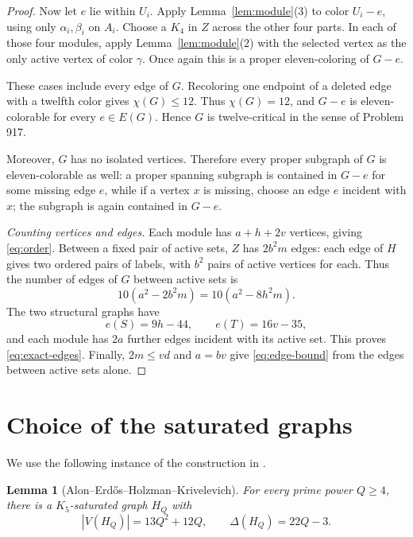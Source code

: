 \documentclass[11pt]{article}
\newtheorem{lemma}[theorem]{Lemma}
\numberwithin{equation}{section}
\begin{document}
\begin{proof}
Now let \(e\) lie within \(U_i\). Apply
Lemma~\ref{lem:module}(3) to color \(U_i-e\), using only
\(\alpha_i,\beta_i\) on \(A_i\). Choose a \(K_4\) in \(Z\)
across the other four parts. In each of those four modules,
apply Lemma~\ref{lem:module}(2) with the selected vertex as
the only active vertex of color \(\gamma\). Once again this
is a proper eleven-coloring of \(G-e\).

These cases include every edge of \(G\). Recoloring one endpoint
of a deleted edge with a twelfth color gives \(\chi(G)\le12\).
Thus \(\chi(G)=12\), and \(G-e\) is eleven-colorable for every
\(e\in E(G)\). Hence \(G\) is twelve-critical in the sense of
Problem 917.

Moreover, \(G\) has no isolated vertices. Therefore every proper
subgraph of \(G\) is eleven-colorable as well: a proper spanning
subgraph is contained in \(G-e\) for some missing edge \(e\), while
if a vertex \(x\) is missing, choose an edge \(e\) incident with
\(x\); the subgraph is again contained in \(G-e\).

\smallskip
\noindent\emph{Counting vertices and edges.}
Each module has \(a+h+2v\) vertices, giving \eqref{eq:order}.
Between a fixed pair of active sets, \(Z\) has \(2b^2m\) edges:
each edge of \(H\) gives two ordered pairs of labels, with
\(b^2\) pairs of active vertices for each. Thus the number of
edges of \(G\) between active sets is
\[
 10(a^2-2b^2m)=10(a^2-8h^2m).
\]
The two structural graphs have
\[
 e(S)=9h-44,\qquad e(T)=16v-35,
\]
and each module has \(2a\) further edges incident with its active
set. This proves \eqref{eq:exact-edges}. Finally, \(2m\le vd\)
and \(a=bv\) give \eqref{eq:edge-bound} from the edges between
active sets alone.
\end{proof}

\section{Choice of the saturated graphs}
\label{sec:parameters}

We use the following instance of the construction in
\cite[Section 4, Example 2]{AEHK}.

\begin{lemma}[Alon--Erd\H{o}s--Holzman--Krivelevich]
\label{lem:saturation}
For every prime power \(Q\ge4\), there is a \(K_5\)-saturated
graph \(H_Q\) with
\begin{equation}\label{eq:H-parameters}
 |V(H_Q)|=13Q^2+12Q,
 \qquad \Delta(H_Q)=22Q-3.
\end{equation}
\end{lemma}
\end{document}
